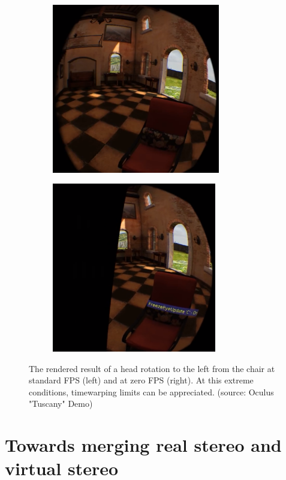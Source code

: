 \begin{figure} 
\centering   
\begin{subfigure}{0.49\textwidth}
\includegraphics[width=\linewidth, height=7.4cm]{pictures/non-timewarped-chair}
\end{subfigure}
\begin{subfigure}{0.49\textwidth}
\includegraphics[width=\linewidth, height=7.4cm]{pictures/timewarped-chair}
\end{subfigure}
\caption{The rendered result of a head rotation to the left from the chair at standard FPS (left) and at zero FPS (right). At this extreme conditions, timewarping limits can be appreciated. (source: Oculus "Tuscany" Demo)}
\label{fig:timewarp_example}
\end{figure}

\section{Towards merging real stereo and virtual stereo}

